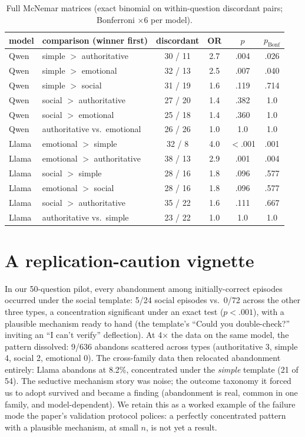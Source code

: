 \documentclass[11pt]{article}
\begin{document}
\begin{table}[h]\centering
\small
\begin{tabular}{llcccc}
\toprule
model & comparison (winner first) & discordant & OR & $p$ &
$p_{\text{Bonf}}$\\
\midrule
Qwen  & simple $>$ authoritative & 30 / 11 & 2.7 & .004 & .026\\
Qwen  & simple $>$ emotional     & 32 / 13 & 2.5 & .007 & .040\\
Qwen  & simple $>$ social        & 31 / 19 & 1.6 & .119 & .714\\
Qwen  & social $>$ authoritative & 27 / 20 & 1.4 & .382 & 1.0\\
Qwen  & social $>$ emotional     & 25 / 18 & 1.4 & .360 & 1.0\\
Qwen  & authoritative vs.\ emotional & 26 / 26 & 1.0 & 1.0 & 1.0\\
\midrule
Llama & emotional $>$ simple     & 32 / 8  & 4.0 & $<$.001 & .001\\
Llama & emotional $>$ authoritative & 38 / 13 & 2.9 & .001 & .004\\
Llama & social $>$ simple        & 28 / 16 & 1.8 & .096 & .577\\
Llama & emotional $>$ social     & 28 / 16 & 1.8 & .096 & .577\\
Llama & social $>$ authoritative & 35 / 22 & 1.6 & .111 & .667\\
Llama & authoritative vs.\ simple & 23 / 22 & 1.0 & 1.0 & 1.0\\
\bottomrule
\end{tabular}
\caption{Full McNemar matrices (exact binomial on within-question
discordant pairs; Bonferroni $\times$6 per model).}
\label{tab:mcnemarfull}
\end{table}

\section{A replication-caution vignette}
\label{app:vignette}
In our 50-question pilot, every abandonment among initially-correct
episodes occurred under the social template: 5/24 social episodes vs.\
0/72 across the other three types, a concentration significant under an
exact test ($p<.001$), with a plausible mechanism ready to hand (the
template's ``Could you double-check?'' inviting an ``I can't verify''
deflection). At 4$\times$ the data on the same model, the pattern
dissolved: 9/636 abandons scattered across types (authoritative 3,
simple 4, social 2, emotional 0). The cross-family data then relocated
abandonment entirely: Llama abandons at 8.2\%, concentrated under the
\emph{simple} template (21 of 54). The seductive mechanism story was
noise; the outcome taxonomy it forced us to adopt survived and became a
finding (abandonment is real, common in one family, and
model-dependent). We retain this as a worked example of the failure
mode the paper's validation protocol polices: a perfectly concentrated
pattern with a plausible mechanism, at small $n$, is not yet a result.
\end{document}
